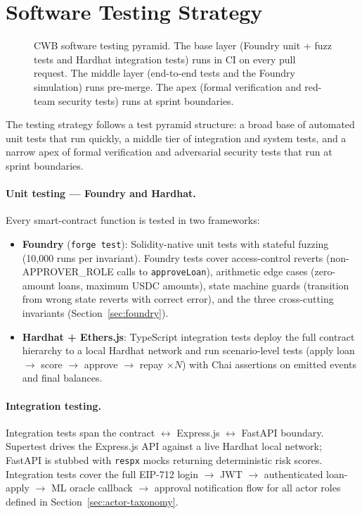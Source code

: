 \section{Software Testing Strategy}
\label{sec:testing}

\begin{figure}[H]
\centering
{}
\caption{CWB software testing pyramid. The base layer (Foundry unit + fuzz
tests and Hardhat integration tests) runs in CI on every pull request. The
middle layer (end-to-end tests and the Foundry simulation) runs pre-merge.
The apex (formal verification and red-team security tests) runs at sprint
boundaries.}
\label{fig:testing-pyramid}
\end{figure}

The testing strategy follows a test pyramid structure: a broad base of
automated unit tests that run quickly, a middle tier of integration and
system tests, and a narrow apex of formal verification and adversarial
security tests that run at sprint boundaries.

\paragraph{Unit testing --- Foundry and Hardhat.}
Every smart-contract function is tested in two frameworks:
\begin{itemize}[noitemsep]
\item \textbf{Foundry} (\texttt{forge test}): Solidity-native unit tests
with stateful fuzzing (10{,}000 runs per invariant). Foundry tests cover
access-control reverts (non-APPROVER\_ROLE calls to \texttt{approveLoan}),
arithmetic edge cases (zero-amount loans, maximum USDC amounts), state
machine guards (transition from wrong state reverts with correct error),
and the three cross-cutting invariants
(Section~\ref{sec:foundry}).
\item \textbf{Hardhat + Ethers.js}: TypeScript integration tests deploy the
full contract hierarchy to a local Hardhat network and run scenario-level
tests (apply loan $\to$ score $\to$ approve $\to$ repay $\times N$) with
Chai assertions on emitted events and final balances.
\end{itemize}

\paragraph{Integration testing.}
Integration tests span the contract $\leftrightarrow$ Express.js
$\leftrightarrow$ FastAPI boundary. Supertest drives the Express.js API
against a live Hardhat local network; FastAPI is stubbed with
\texttt{respx} mocks returning deterministic risk scores. Integration tests
cover the full EIP-712 login $\to$ JWT $\to$ authenticated loan-apply
$\to$ ML oracle callback $\to$ approval notification flow for all actor
roles defined in Section~\ref{sec:actor-taxonomy}.

